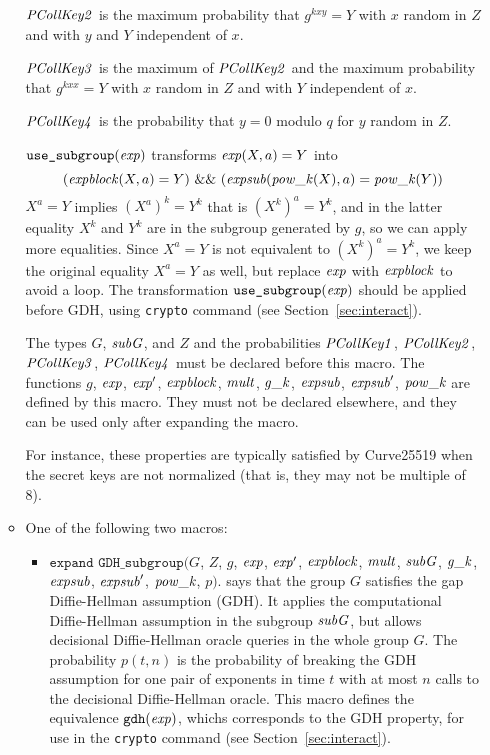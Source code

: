\documentclass{article}
\begin{document}
\begin{itemize}
\begin{itemize}
       $\mathit{PCollKey2}$ is the maximum probability that $g^{kxy} = Y$ with $x$ random in $Z$ and with $y$ and $Y$ independent of $x$.

       $\mathit{PCollKey3}$ is the maximum of $\mathit{PCollKey2}$ and 
                the maximum probability that $g^{kxx} = Y$ with $x$ random in $Z$ and with $Y$ independent of $x$.

       $\mathit{PCollKey4}$ is the probability that $y = 0$ modulo $q$ for $y$ random in $Z$.


       $\texttt{use\_subgroup}(\mathit{exp})$ transforms
       $\mathit{exp}(X,a) = Y$ into
       \[(\vn{expblock}(X,a) = Y) \ \&\&\ (\vn{expsub}(\vn{pow\_k}(X),a) =
       \vn{pow\_k}(Y))\]
       $X^a = Y$ implies $(X^a)^k = Y^k$ that is $(X^k)^a = Y^k$, and
       in the latter equality $X^k$ and $Y^k$ are in the subgroup
       generated by $g$, so we can apply more equalities.  Since
       $X^a = Y$ is not equivalent to $(X^k)^a = Y^k$, we keep the
       original equality $X^a = Y$ as well, but replace $\mathit{exp}$
       with $\mathit{expblock}$ to avoid a loop. The transformation
       $\texttt{use\_subgroup}(\mathit{exp})$ should be applied before
       GDH, using \texttt{crypto} command (see
       Section~\ref{sec:interact}).
       
       The types $G$, $\mathit{subG}$, and $Z$ and the probabilities $\mathit{PCollKey1}$, $\mathit{PCollKey2}$, 
       $\mathit{PCollKey3}$, $\mathit{PCollKey4}$ must be declared before this macro.  The
       functions $g$, $\mathit{exp}$, $\mathit{exp}'$, $\mathit{expblock}$, $\mathit{mult}$, $\mathit{g\_k}$, $\mathit{expsub}$, $\mathit{expsub}'$, $\mathit{pow\_k}$
       are defined by this macro. They must not be declared
       elsewhere, and they can be used only after expanding the macro.

       For instance, these properties are typically satisfied by Curve25519 when
       the secret keys are not normalized (that is, they may not be multiple of 8).

   \item One of the following two macros:
     \begin{itemize}
     \item $\texttt{expand\ GDH\_subgroup(}G$, $Z$, $g$, $\mathit{exp}$, $\mathit{exp}'$, $\mathit{expblock}$, $\mathit{mult}$, $\mathit{subG}$, $\mathit{g\_k}$, $\mathit{expsub}$, $\mathit{expsub}'$, $\mathit{pow\_k}$, $p\texttt{).}$ says that the group $G$ satisfies the gap Diffie-Hellman
       assumption (GDH). It applies the computational Diffie-Hellman assumption in the subgroup $\mathit{subG}$, but allows decisional Diffie-Hellman oracle queries in the whole group $G$. The probability $p(t,n)$ is the probability of breaking
       the GDH assumption for one pair of exponents in time $t$ with at most $n$ 
       calls to the decisional Diffie-Hellman oracle. This macro defines
       the equivalence $\texttt{gdh}(\mathit{exp})$, whichs corresponds to the GDH property, for use in the
       \texttt{crypto} command (see Section~\ref{sec:interact}).


\end{itemize}
\end{itemize}
\end{itemize}
\end{document}
